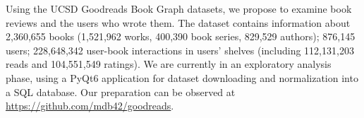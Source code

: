 Using the UCSD Goodreads Book Graph datasets, we propose to examine book reviews and
the users who wrote them. The dataset contains information about 2,360,655 books
(1,521,962 works, 400,390 book series, 829,529 authors); 876,145 users; 228,648,342
user-book interactions in users' shelves (including 112,131,203 reads and 104,551,549
ratings). We are currently in an exploratory analysis phase, using a PyQt6
application for dataset downloading and normalization into a SQL database. Our
preparation can be observed at
\href{https://github.com/mdb42/goodreads}{https://github.com/mdb42/goodreads}.